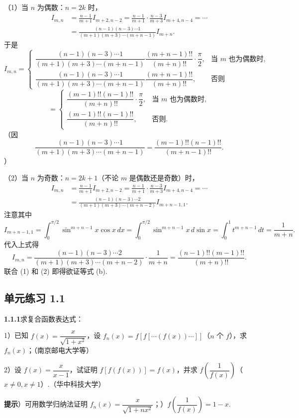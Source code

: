 \documentclass[UTF8, 12pt, fontset=fandol, oneside]{ctexart}
\begin{document}
（1）当 $n$ 为偶数：$n=2k$ 时，
\[
\begin{aligned}
I_{m,n}
&=\frac{n-1}{m+1}I_{m+2,n-2}
=\frac{n-1}{m+1}\cdot\frac{n-3}{m+3}I_{m+4,n-4}=\cdots\\
&=\frac{(n-1)(n-3)\cdots1}{(m+1)(m+3)\cdots(m+n-1)}I_{m+n}.
\end{aligned}
\]
于是
\[
I_{m,n}=
\begin{cases}
\dfrac{(n-1)(n-3)\cdots1}{(m+1)(m+3)\cdots(m+n-1)}
\dfrac{(m+n-1)!!}{(m+n)!!}\cdot\dfrac\pi2, & \text{当 }m\text{ 也为偶数时},\\[1em]
\dfrac{(n-1)(n-3)\cdots1}{(m+1)(m+3)\cdots(m+n-1)}
\dfrac{(m+n-1)!!}{(m+n)!!}, & \text{否则}
\end{cases}
\]
\[
=
\begin{cases}
\dfrac{(m-1)!!(n-1)!!}{(m+n)!!}\cdot\dfrac\pi2, & \text{当 }m\text{ 也为偶数时},\\[1em]
\dfrac{(m-1)!!(n-1)!!}{(m+n)!!}, & \text{否则}.
\end{cases}
\]
（因
\[
  \frac{(n-1)(n-3)\cdots1}{(m+1)(m+3)\cdots(m+n-1)}
  =\frac{(m-1)!!(n-1)!!}{(m+n-1)!!}.
\]
）

（2）当 $n$ 为奇数：$n=2k+1$（不论 $m$ 是偶数还是奇数）时，
\[
\begin{aligned}
I_{m,n}
&=\frac{n-1}{m+1}I_{m+2,n-2}
=\frac{n-1}{m+1}\cdot\frac{n-3}{m+3}I_{m+4,n-4}=\cdots\\
&=\frac{(n-1)(n-3)\cdots2}{(m+1)(m+3)\cdots(m+n-2)}I_{m+n-1,1}.
\end{aligned}
\]
注意其中
\[
I_{m+n-1,1}=\int_0^{\pi/2}\sin^{m+n-1}x\cos x\,dx
=\int_0^{\pi/2}\sin^{m+n-1}x\,d\sin x
=\int_0^1 t^{m+n-1}\,dt=\frac1{m+n}.
\]
代入上式得
\[
  I_{m,n}
  =\frac{(n-1)(n-3)\cdots2}{(m+1)(m+3)\cdots(m+n-2)}\cdot\frac1{m+n}
  =\frac{(n-1)!!(m-1)!!}{(m+n)!!}.
\]
联合 (1) 和 (2) 即得欲证等式 (b).

\subsection*{单元练习 1.1}

\noindent\textbf{1.1.1}\quad 求复合函数表达式：

1）已知 $f(x)=\dfrac{x}{\sqrt{1+x^2}}$，设 $f_n(x)=f[f[\cdots(f(x))\cdots]]$（$n$ 个 $f$），求 $f_n(x)$；（南京邮电大学等）

2）设 $f(x)=\dfrac{x}{x-1}$，试证明 $f[f(f(x))]=f(x)$，并求 $f\left(\dfrac1{f(x)}\right)$（$x\ne0,x\ne1$）.（华中科技大学）

\noindent\textbf{提示}）可用数学归纳法证明 $f_n(x)=\dfrac{x}{\sqrt{1+nx^2}}$；）$f\left(\dfrac1{f(x)}\right)=1-x$.
\end{document}
